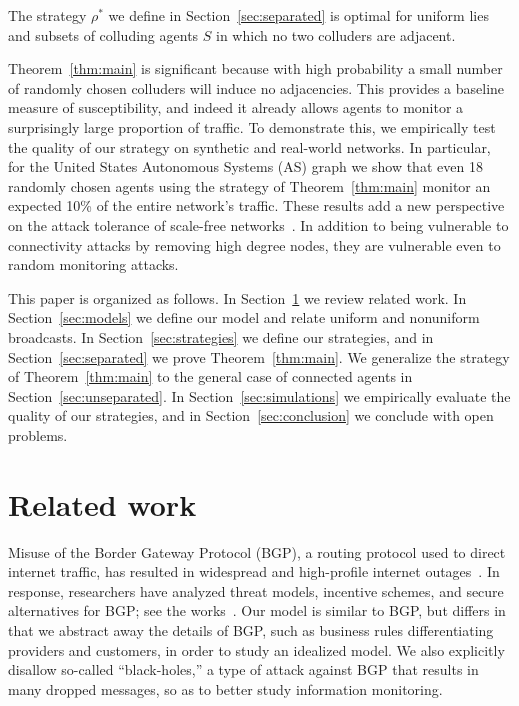 \documentclass[prodmode,acmec]{ec-acmsmall}
\begin{document}
\begin{theorem} \label{thm:main}
The strategy $\rho^*$ we define in Section~\ref{sec:separated} is optimal for
uniform lies and subsets of colluding agents $S$ in which no two colluders are
adjacent.
\end{theorem}

Theorem~\ref{thm:main} is significant because with high probability a small
number of randomly chosen colluders will induce no adjacencies. This provides a
baseline measure of susceptibility, and indeed it already allows agents to
monitor a surprisingly large proportion of traffic. To demonstrate this, we
empirically test the quality of our strategy on synthetic and real-world
networks. In particular, for the United States Autonomous Systems (AS) graph
we show that even 18 randomly chosen agents using the strategy of
Theorem~\ref{thm:main} monitor an expected 10\% of the entire network's
traffic. These results add a new perspective on the attack tolerance of
scale-free networks~\cite{AlbertJB00}. In addition to being vulnerable to
connectivity attacks by removing high degree nodes, they are vulnerable even to
random monitoring attacks. 

This paper is organized as follows. In Section~\ref{sec:related} we review 
related work. In Section~\ref{sec:models} we define our model and relate
uniform and nonuniform broadcasts. In Section~\ref{sec:strategies} we define
our strategies, and in Section~\ref{sec:separated} we prove
Theorem~\ref{thm:main}. We generalize the strategy of Theorem~\ref{thm:main} to
the general case of connected agents in Section~\ref{sec:unseparated}. In
Section~\ref{sec:simulations} we empirically evaluate the quality of our
strategies, and in Section~\ref{sec:conclusion} we conclude with open problems.


\section{Related work} \label{sec:related}

Misuse of the Border Gateway Protocol (BGP), a routing protocol used to direct
internet traffic, has resulted in widespread and high-profile internet
outages~\cite{Stone08}. In response, researchers have analyzed threat models,
incentive schemes, and secure alternatives for BGP; see the
works~\cite{ButlerFMR10,GoldbergSHR10,BallaniFZ07,NordstromD04,GoldbergHJRW08,LevinSZ08}.
Our model is similar to BGP, but differs in that we abstract away the details
of BGP, such as business rules differentiating providers and customers, in
order to study an idealized model. We also explicitly disallow so-called
``black-holes,'' a type of attack against BGP that results in many dropped
messages, so as to better study information monitoring.
\end{document}
